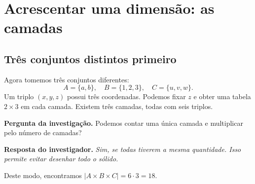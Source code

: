 \documentclass[11pt,a4paper,oneside]{book}
\newcommand{\Pergunta}[1]{\begin{perguntabox}\textbf{Pergunta da investigação.} #1\end{perguntabox}}
\newcommand{\Resposta}[1]{\textcolor{verdeescuro}{\textbf{Resposta do investigador.}} \emph{#1}\par}
\newcommand{\card}[1]{\lvert #1\rvert}
\begin{document}
\chapter{Acrescentar uma dimensão: as camadas}
\section{Três conjuntos distintos primeiro}
Agora tomemos três conjuntos diferentes:
\[A=\{a,b\},\quad B=\{1,2,3\},\quad C=\{u,v,w\}.\]
Um triplo $(x,y,z)$ possui três coordenadas. Podemos fixar $z$ e obter uma tabela $2\times3$ em cada camada. Existem três camadas, todas com seis triplos.
\begin{center}
\end{center}
\Pergunta{Podemos contar uma única camada e multiplicar pelo número de camadas?}
\Resposta{Sim, se todas tiverem a mesma quantidade. Isso permite evitar desenhar todo o sólido.}
Deste modo, encontramos $\card{A\times B\times C}=6\cdot3=18$.
\end{document}
